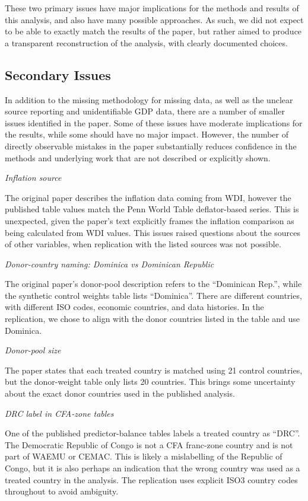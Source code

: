 \documentclass[a4paper]{article}
\begin{document}
These two primary issues have major implications for the methods and results of this analysis, and also have many possible approaches. As such, we did not expect to be able to exactly match the results of the paper, but rather aimed to produce a transparent reconstruction of the analysis, with clearly documented choices.

\subsection{Secondary Issues}
In addition to the missing methodology for missing data, as well as the unclear source reporting and unidentifiable GDP data, there are a number of smaller issues identified in the paper. Some of these issues have moderate implications for the results, while some should have no major impact. However, the number of directly observable mistakes in the paper substantially reduces confidence in the methods and underlying work that are not described or explicitly shown.

\textit{Inflation source}

The original paper describes the inflation data coming from WDI, however the published table values match the Penn World Table deflator-based series. This is unexpected, given the paper's text explicitly frames the inflation comparison as being calculated from WDI values. This issues raised questions about the sources of other variables, when replication with the listed sources was not possible. 

\textit{Donor-country naming: Dominica vs Dominican Republic}

The original paper's donor-pool description refers to the “Dominican Rep.”, while the synthetic control weights table lists “Dominica”. There are different countries, with different ISO codes, economic countries, and data histories. In the replication, we chose to align with the donor countries listed in the table and use Dominica.

\textit{Donor-pool size}

The paper states that each treated country is matched using 21 control countries, but the donor-weight table only lists 20 countries. This brings some uncertainty about the exact donor countries used in the published analysis.

\textit{DRC label in CFA-zone tables}

One of the published predictor-balance tables labels a treated country as “DRC”. The Democratic Republic of Congo is not a CFA franc-zone country and is not part of WAEMU or CEMAC. This is likely a mislabelling of the Republic of Congo, but it is also perhaps an indication that the wrong country was used as a treated country in the analysis. The replication uses explicit ISO3 country codes throughout to avoid ambiguity.
\end{document}
